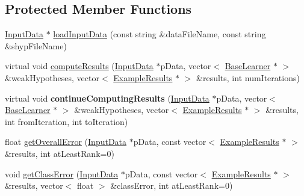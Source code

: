 \subsection*{Protected Member Functions}
\begin{DoxyCompactItemize}
\item 
\hyperlink{classMultiBoost_1_1InputData}{Input\-Data} $\ast$ \hyperlink{classMultiBoost_1_1AdaBoostMHClassifier_aebe7426f99d7ce383db674d2f9c61707}{load\-Input\-Data} (const string \&data\-File\-Name, const string \&shyp\-File\-Name)
\item 
virtual void \hyperlink{classMultiBoost_1_1AdaBoostMHClassifier_a0a1f7718d804518845ef3ce6f2cf1eb7}{compute\-Results} (\hyperlink{classMultiBoost_1_1InputData}{Input\-Data} $\ast$p\-Data, vector$<$ \hyperlink{classMultiBoost_1_1BaseLearner}{Base\-Learner} $\ast$ $>$ \&weak\-Hypotheses, vector$<$ \hyperlink{classMultiBoost_1_1ExampleResults}{Example\-Results} $\ast$ $>$ \&results, int num\-Iterations)
\item 
\hypertarget{classMultiBoost_1_1AdaBoostMHClassifier_a61ea259cf10c9807efd098b5fcabf832}{virtual void {\bfseries continue\-Computing\-Results} (\hyperlink{classMultiBoost_1_1InputData}{Input\-Data} $\ast$p\-Data, vector$<$ \hyperlink{classMultiBoost_1_1BaseLearner}{Base\-Learner} $\ast$ $>$ \&weak\-Hypotheses, vector$<$ \hyperlink{classMultiBoost_1_1ExampleResults}{Example\-Results} $\ast$ $>$ \&results, int from\-Iteration, int to\-Iteration)}\label{classMultiBoost_1_1AdaBoostMHClassifier_a61ea259cf10c9807efd098b5fcabf832}

\item 
float \hyperlink{classMultiBoost_1_1AdaBoostMHClassifier_a0b98c67671717ea2321888d87339e933}{get\-Overall\-Error} (\hyperlink{classMultiBoost_1_1InputData}{Input\-Data} $\ast$p\-Data, const vector$<$ \hyperlink{classMultiBoost_1_1ExampleResults}{Example\-Results} $\ast$ $>$ \&results, int at\-Least\-Rank=0)
\item 
void \hyperlink{classMultiBoost_1_1AdaBoostMHClassifier_a3b03659702a98eb6b49160841c269480}{get\-Class\-Error} (\hyperlink{classMultiBoost_1_1InputData}{Input\-Data} $\ast$p\-Data, const vector$<$ \hyperlink{classMultiBoost_1_1ExampleResults}{Example\-Results} $\ast$ $>$ \&results, vector$<$ float $>$ \&class\-Error, int at\-Least\-Rank=0)
\end{DoxyCompactItemize}
